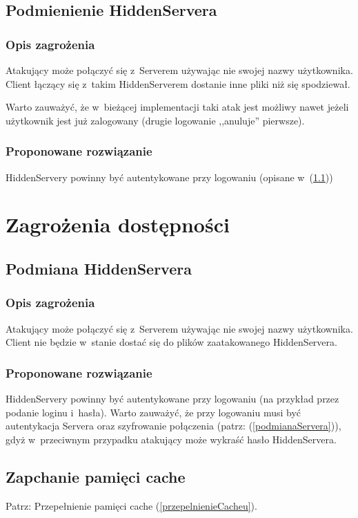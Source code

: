 \documentclass[a4paper,notitlepage]{article}
\begin{document}
\subsection{Podmienienie HiddenServera}
\subsubsection*{Opis zagrożenia}
Atakujący może połączyć się z~Serverem używając nie swojej nazwy użytkownika.
Client łączący się z~takim HiddenServerem dostanie inne pliki 
niż się spodziewał.

Warto zauważyć, że w~bieżącej implementacji taki atak jest możliwy nawet
jeżeli użytkownik jest już zalogowany (drugie logowanie ,,anuluje'' pierwsze).
\subsubsection*{Proponowane rozwiązanie}
HiddenServery powinny być autentykowane przy logowaniu 
(opisane w~(\ref{podmianaHiddenServera}))

\section{Zagrożenia dostępności}
\subsection{Podmiana HiddenServera}
\label{podmianaHiddenServera}
\subsubsection*{Opis zagrożenia}
Atakujący może połączyć się z~Serverem używając nie swojej nazwy użytkownika.
Client nie będzie w~stanie dostać się do plików zaatakowanego HiddenServera.

\subsubsection*{Proponowane rozwiązanie}
HiddenServery powinny być autentykowane przy logowaniu (na przykład przez
podanie loginu i~hasła). Warto zauważyć, że przy logowaniu musi być
autentykacja Servera oraz szyfrowanie połączenia 
(patrz: (\ref{podmianaServera})), gdyż w~przeciwnym
przypadku atakujący może wykraść hasło HiddenServera.

\subsection{Zapchanie pamięci cache}
Patrz: Przepełnienie pamięci cache (\ref{przepelnienieCacheu}). 
\end{document}
